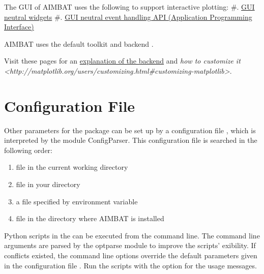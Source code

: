 \documentclass[letterpaper,10pt,english]{sphinxmanual}
\begin{document}
The GUI of AIMBAT uses the following to support interactive plotting:
\#. \href{http://matplotlib.org/api/widgets\_api.html}{GUI neutral widgets}
\#. \href{http://matplotlib.org/users/event\_handling.html}{GUI neutral event handling API (Application Programming Interface)}

AIMBAT uses the default toolkit  and backend .

Visit these pages for an \href{http://matplotlib.org/faq/usage\_faq.html\#what-is-a-backend}{explanation of the backend} and \emph{how to customize it \textless{}http://matplotlib.org/users/customizing.html\#customizing-matplotlib\textgreater{}}.


\section{Configuration File}
\label{docfiles/parameterConfiguration:configuration-file}
Other parameters for the package can be set up by a configuration file , which is interpreted by the module ConfigParser. This configuration file is searched in the following order:
\begin{enumerate}
\item {} 
file  in the current working directory

\item {} 
file  in your  directory

\item {} 
a file specified by environment variable 

\item {} 
file  in the directory where AIMBAT is installed

\end{enumerate}

Python scripts in the  can be executed from the command line. The command line arguments are parsed by the optparse module to improve the scripts' exibility. If conflicts existed, the command line options override the default parameters given in the configuration file . Run the scripts with the  option for the usage messages.
\end{document}
